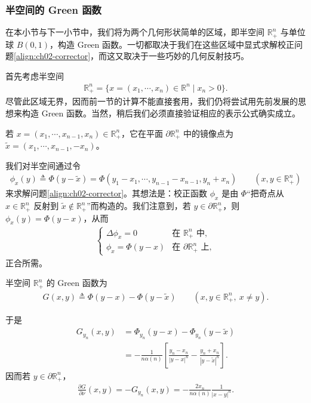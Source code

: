 \documentclass[../../main.tex]{subfiles}
\begin{document}
\subsubsection{半空间的 Green 函数}

在本小节与下一小节中，我们将为两个几何形状简单的区域，即半空间 $\mathbb{R}^n_+$ 与单位球 $B(0,1)$，构造 Green 函数。一切都取决于我们在这些区域中显式求解校正问题\eqref{align:ch02-corrector}，而这又取决于一些巧妙的几何反射技巧。

首先考虑半空间
\begin{align*}
\mathbb{R}^n_+=\{x=(x_1,\cdots,x_n)\in\mathbb{R}^n\mid x_n>0\}.
\end{align*}
尽管此区域无界，因而前一节的计算不能直接套用，我们仍将尝试用先前发展的思想来构造 Green 函数。当然，稍后我们必须直接验证相应的表示公式确实成立。

\begin{definition}\label{definition:ch02-reflection}
若 $x=(x_1,\cdots,x_{n-1},x_n)\in\mathbb{R}^n_+$，它在平面 $\partial\mathbb{R}^n_+$ 中的镜像点为 $\widetilde{x}=(x_1,\cdots,x_{n-1},-x_n)$。
\end{definition}

我们对半空间通过令
\begin{align*}
\phi_x(y)\triangleq\Phi(y-\widetilde{x})=\Phi(y_1-x_1,\cdots,y_{n-1}-x_{n-1},y_n+x_n) \qquad (x,y\in\mathbb{R}^n_+)
\end{align*}
来求解问题\eqref{align:ch02-corrector}。其想法是：校正函数 $\phi_x$ 是由 $\Phi$``把奇点从 $x\in\mathbb{R}^n_+$ 反射到 $\widetilde{x}\notin\mathbb{R}^n_+$''而构造的。我们注意到，若 $y\in\partial\mathbb{R}^n_+$，则 $\phi_x(y)=\Phi(y-x)$，从而
\begin{align*}
\begin{cases}
\Delta\phi_x=0 & \text{在 }\mathbb{R}^n_+\text{ 中},\\
\phi_x=\Phi(y-x) & \text{在 }\partial\mathbb{R}^n_+ \text{ 上},
\end{cases}
\end{align*}
正合所需。

\begin{definition}\label{definition:ch02-green-halfspace}
半空间 $\mathbb{R}^n_+$ 的 Green 函数为
\begin{align*}
G(x,y)\triangleq\Phi(y-x)-\Phi(y-\widetilde{x}) \qquad (x,y\in\mathbb{R}^n_+,\ x\neq y).
\end{align*}
\end{definition}

于是
\begin{align*}
G_{y_n}(x,y)&=\Phi_{y_n}(y-x)-\Phi_{y_n}(y-\widetilde{x})\\
&=-\frac{1}{n\alpha(n)}\left[\frac{y_n-x_n}{|y-x|^n}-\frac{y_n+x_n}{|y-\widetilde{x}|^n}\right].
\end{align*}
因而若 $y\in\partial\mathbb{R}^n_+$，
\begin{align*}
\frac{\partial G}{\partial\nu}(x,y)=-G_{y_n}(x,y)=-\frac{2x_n}{n\alpha(n)}\frac{1}{|x-y|^n}.
\end{align*}
\end{document}
